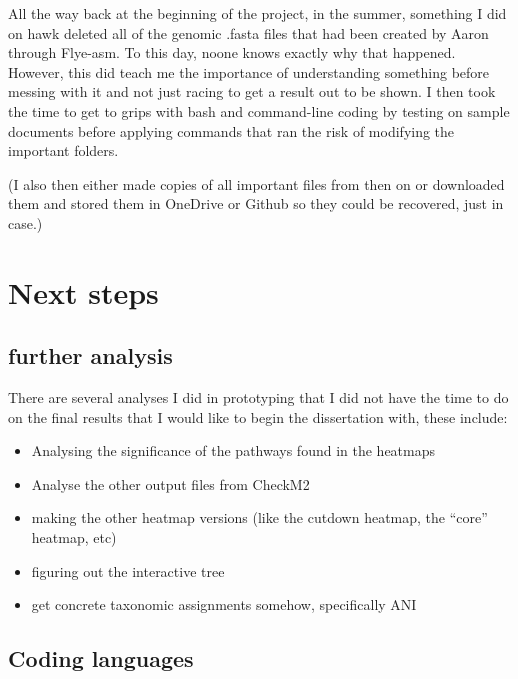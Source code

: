 \documentclass[
  letterpaper,
  DIV=11,
  numbers=noendperiod]{scrreprt}
\begin{document}
All the way back at the beginning of the project, in the summer,
something I did on hawk deleted all of the genomic .fasta files that had
been created by Aaron through Flye-asm. To this day, noone knows exactly
why that happened. However, this did teach me the importance of
understanding something before messing with it and not just racing to
get a result out to be shown. I then took the time to get to grips with
bash and command-line coding by testing on sample documents before
applying commands that ran the risk of modifying the important folders.

(I also then either made copies of all important files from then on or
downloaded them and stored them in OneDrive or Github so they could be
recovered, just in case.)

\section{Next steps}\label{next-steps-1}

\subsection{further analysis}\label{further-analysis}

There are several analyses I did in prototyping that I did not have the
time to do on the final results that I would like to begin the
dissertation with, these include:

\begin{itemize}
\item
  Analysing the significance of the pathways found in the heatmaps
\item
  Analyse the other output files from CheckM2
\item
  making the other heatmap versions (like the cutdown heatmap, the
  ``core'' heatmap, etc)
\item
  figuring out the interactive tree
\item
  get concrete taxonomic assignments somehow, specifically ANI
\end{itemize}

\subsection{Coding languages}\label{coding-languages}
\end{document}
